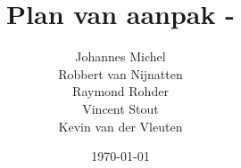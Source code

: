 


\author{Johannes Michel\\Robbert van Nijnatten\\Raymond Rohder\\Vincent Stout\\Kevin van der Vleuten}
\title{Plan van aanpak - \projectname}
\date{\today}



\maketitle

\renewcommand*\contentsname{Inhoud}
\tableofcontents

%

















